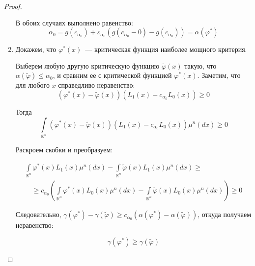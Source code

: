 \begin{proof}
\begin{enumerate}
В обоих случаях выполнено равенство:
\begin{equation*}
    \alpha_{0}=g\left(c_{\alpha_{0}}\right)+\varepsilon_{\alpha_{0}}\left(g\left(c_{\alpha_{0}}-0\right)-g\left(c_{\alpha_{0}}\right)\right)=\alpha\left(\varphi^{*}\right)
\end{equation*}

\item Докажем, что $\varphi^{*}(x)$~--- критическая функция наиболее мощного критерия.

Выберем любую другую критическую функцию $\tilde{\varphi}(x)$ такую, что $\alpha(\tilde{\varphi}) \leqslant \alpha_{0}$, и сравним ее с критической функцией $\varphi^{*}(x)$. Заметим, что для любого $x$ справедливо неравенство:
\begin{equation*}
    \left(\varphi^{*}(x)-\tilde{\varphi}(x)\right)\left(L_{1}(x)-c_{\alpha_{0}} L_{0}(x)\right) \geqslant 0
\end{equation*}

Тогда
\begin{equation*}
    \int\limits_{\mathbb{R}^{n}}\left(\varphi^{*}(x)-\tilde{\varphi}(x)\right)\left(L_{1}(x)-c_{\alpha_{0}} L_{0}(x)\right) \mu^{n}(d x) \geqslant 0
\end{equation*}

Раскроем скобки и преобразуем:

\begin{equation*}
    \begin{array}{l}
\int\limits_{\mathbb{R}^{n}} \varphi^{*}(x) L_{1}(x) \mu^{n}(d x)-\int\limits_{\mathbb{R}^{n}} \tilde{\varphi}(x) L_{1}(x) \mu^{n}(d x) \geqslant \\
\quad \geqslant c_{\alpha_{0}}\left(\int\limits_{\mathbb{R}^{n}} \varphi^{*}(x) L_{0}(x) \mu^{n}(d x)-\int\limits_{\mathbb{R}^{n}} \tilde{\varphi}(x) L_{0}(x) \mu^{n}(d x)\right) \geqslant 0
\end{array}
\end{equation*}

Следовательно, $\gamma\left(\varphi^{*}\right)-\gamma(\tilde{\varphi}) \geqslant c_{\alpha_{0}}\left(\alpha\left(\varphi^{*}\right)-\alpha(\tilde{\varphi})\right)$, откуда получаем неравенство:

\begin{equation*}
    \gamma\left(\varphi^{*}\right) \geqslant \gamma(\tilde{\varphi})
\end{equation*}
\end{enumerate}
\end{proof}

